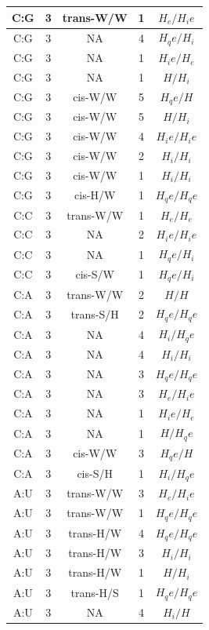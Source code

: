 \begin{center}
\begin{longtable}{c|c|c|c|c}
C:G & 3 & trans-W/W & 1 & $H_e/H_ie$ \\  \hline
C:G & 3 & NA & 4 & $H_qe/H_i$ \\  \hline
C:G & 3 & NA & 1 & $H_ie/H_e$ \\  \hline
C:G & 3 & NA & 1 & $H/H_i$ \\  \hline
C:G & 3 & cis-W/W & 5 & $H_qe/H$ \\  \hline
C:G & 3 & cis-W/W & 5 & $H/H_i$ \\  \hline
C:G & 3 & cis-W/W & 4 & $H_ie/H_ie$ \\  \hline
C:G & 3 & cis-W/W & 2 & $H_i/H_i$ \\  \hline
C:G & 3 & cis-W/W & 1 & $H_i/H_i$ \\  \hline
C:G & 3 & cis-H/W & 1 & $H_qe/H_qe$ \\  \hline
C:C & 3 & trans-W/W & 1 & $H_e/H_e$ \\  \hline
C:C & 3 & NA & 2 & $H_ie/H_ie$ \\  \hline
C:C & 3 & NA & 1 & $H_qe/H_i$ \\  \hline
C:C & 3 & cis-S/W & 1 & $H_qe/H_i$ \\  \hline
C:A & 3 & trans-W/W & 2 & $H/H$ \\  \hline
C:A & 3 & trans-S/H & 2 & $H_qe/H_qe$ \\  \hline
C:A & 3 & NA & 4 & $H_i/H_qe$ \\  \hline
C:A & 3 & NA & 4 & $H_i/H_i$ \\  \hline
C:A & 3 & NA & 3 & $H_qe/H_qe$ \\  \hline
C:A & 3 & NA & 3 & $H_e/H_ie$ \\  \hline
C:A & 3 & NA & 1 & $H_ie/H_e$ \\  \hline
C:A & 3 & NA & 1 & $H/H_qe$ \\  \hline
C:A & 3 & cis-W/W & 3 & $H_qe/H$ \\  \hline
C:A & 3 & cis-S/H & 1 & $H_i/H_qe$ \\  \hline
A:U & 3 & trans-W/W & 3 & $H_e/H_ie$ \\  \hline
A:U & 3 & trans-W/W & 1 & $H_qe/H_qe$ \\  \hline
A:U & 3 & trans-H/W & 4 & $H_qe/H_qe$ \\  \hline
A:U & 3 & trans-H/W & 3 & $H_i/H_i$ \\  \hline
A:U & 3 & trans-H/W & 1 & $H/H_i$ \\  \hline
A:U & 3 & trans-H/S & 1 & $H_qe/H_qe$ \\  \hline
A:U & 3 & NA & 4 & $H_i/H$ \\  \hline

\end{longtable}
\end{center}
